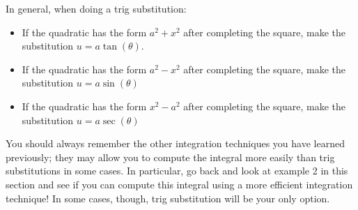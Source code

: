\documentclass{ximera}
\begin{document}
In general, when doing a trig substitution:
\begin{itemize}
\item If the quadratic has the form $a^2 + x^2$ after completing the square, make the substitution $u = a\tan(\theta)$. 
\item If the quadratic has the form $a^2 - x^2$ after completing the square, make the substitution $u = a\sin(\theta)$ 
\item If the quadratic has the form $x^2 - a^2$ after completing the
  square, make the substitution $u = a\sec(\theta)$
\end{itemize}

You should always remember the other integration techniques you have learned previously; they may allow you to compute the integral more easily than trig substitutions in some cases. In particular, go back and look at example 2 in this section and see if you can compute this integral using a more efficient integration technique!  In some cases, though, trig substitution will be your only option.
\end{document}
